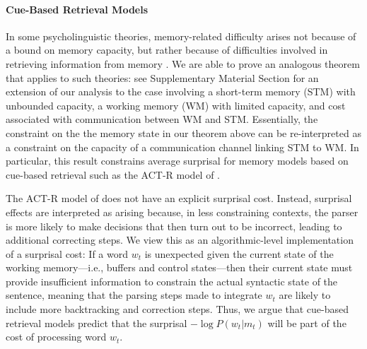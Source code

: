 \paragraph{Cue-Based Retrieval Models}

In some psycholinguistic theories, memory-related difficulty arises not because of a bound on memory capacity, but rather because of difficulties involved in retrieving information from memory \citep{mcelree2000sentence,lewis-activation-based-2005,nicenboim2018models,vasishth2019computational}. We are able to prove an analogous theorem that applies to such theories: see Supplementary Material Section \REF for an extension of our analysis to the case involving a short-term memory (STM) with unbounded capacity, a working memory (WM) with limited capacity, and cost associated with communication between WM and STM. Essentially, the constraint on the the memory state in our theorem above can be re-interpreted as a constraint on the capacity of a communication channel linking STM to WM. In particular, this result constrains average surprisal for memory models based on cue-based retrieval such as the ACT-R model of \citet{lewis-activation-based-2005}.

The ACT-R model of \cite{lewis-activation-based-2005} does not have an explicit surprisal cost.
Instead, surprisal effects are interpreted as arising because, in less constraining contexts, the parser is more likely to make decisions that then turn out to be incorrect, leading to additional correcting steps.
We view this as an algorithmic-level implementation of a surprisal cost:
If a word $w_t$ is unexpected given the current state of the working memory---i.e., buffers and control states---then their current state must provide insufficient information to constrain the actual syntactic state of the sentence, meaning that the parsing steps made to integrate $w_t$ are likely to include more backtracking and correction steps.
Thus, we argue that cue-based retrieval models predict that the surprisal $- \log P(w_t|m_t)$ will be part of the cost of processing word $w_t$.

